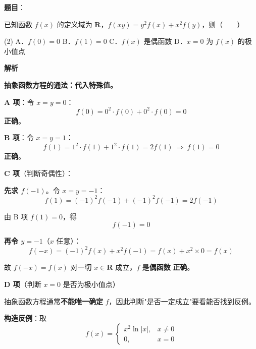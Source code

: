 \begin{answer}

\textbf{题目}：

已知函数 $f(x)$ 的定义域为 $\mathbf R$，$f(xy)=y^{2}f(x)+x^{2}f(y)$，则\mbox{（　　）}

\begin{gkopts}(2)
\task A．$f(0)=0$
\task B．$f(1)=0$
\task C．$f(x)$ 是偶函数
\task D．$x=0$ 为 $f(x)$ 的极小值点
\end{gkopts}

\textbf{解析}

\textbf{抽象函数方程的通法：代入特殊值。}

\par\medskip

\textbf{A 项}：令 $x=y=0$：
\nopagebreak[4]
\[f(0)=0^{2}\cdot f(0)+0^{2}\cdot f(0)=0\]
 \textbf{正确}。

\par\medskip

\textbf{B 项}：令 $x=y=1$：
\nopagebreak[4]
\[f(1)=1^{2}\cdot f(1)+1^{2}\cdot f(1)=2f(1)\ \Longrightarrow\ f(1)=0\]
 \textbf{正确}。

\par\medskip

\textbf{C 项}（判断奇偶性）：

\textbf{先求 $f(-1)$}。令 $x=y=-1$：
\nopagebreak[4]
\[f(1)=(-1)^{2}f(-1)+(-1)^{2}f(-1)=2f(-1)\]

由 B 项 $f(1)=0$，得
\nopagebreak[4]
\[f(-1)=0\]

\textbf{再令 $y=-1$}（$x$ 任意）：
\nopagebreak[4]
\[f(-x)=(-1)^{2}f(x)+x^{2}f(-1)=f(x)+x^{2}\times0=f(x)\]

故 $f(-x)=f(x)$ 对一切 $x\in\mathbf R$ 成立，$f$ 是\textbf{偶函数}  \textbf{正确}。

\par\medskip

\textbf{D 项}（判断 $x=0$ 是否为极小值点）

抽象函数方程通常\textbf{不能唯一确定} $f$，因此判断"是否一定成立"要看能否找到反例。

\textbf{构造反例}：取
\nopagebreak[4]
\[f(x)=\begin{cases}x^{2}\ln|x|,&x\ne0\\ 0,&x=0\end{cases}\]


\end{answer}
